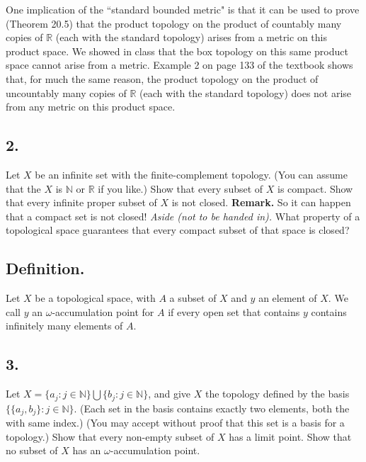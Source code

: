 \documentclass{amsart}
\theoremstyle{plain}
\theoremstyle{definition}
\theoremstyle{remark}
\begin{document}
One implication of the ``standard bounded metric" is that it can be used to prove (Theorem 20.5)  that the product topology on the product of countably many copies of $\mathbb R$ (each with the standard topology) arises from a metric on this product space. We showed in class that the box topology on this same product space cannot arise from a metric. Example 2 on page 133 of the textbook shows that, for much the same reason, the product topology on the product of uncountably many copies of $\mathbb R$ (each with the standard topology) does not arise from any metric on this product space.




\vspace{.15in}
\noindent
\subsection*{2.}  Let $X$ be an infinite set with the finite-complement topology. (You can assume that the $X$ is $\mathbb N$ or $\mathbb R$ if you like.) Show that every subset of $X$ is compact. Show that every infinite proper subset of $X$ is not closed. {\bf Remark.} So it can happen that a compact set is not closed! {\it Aside (not to be handed in).} What property of a topological space guarantees that every compact subset of that space is closed?

\vspace{.15in}
\noindent
\subsection*{Definition.} Let $X$ be a topological space, with $A$ a subset of $X$ and $y$ an element of $X$. We call $y$ an $\omega$-accumulation point for $A$ if every open set that contains $y$ contains infinitely many elements of $A$. 

\vspace{.15in}
\noindent
\subsection*{3.} Let  $X = \{ a_j : j \in \mathbb N \} \bigcup \{ b_j : j \in \mathbb N \}$, and give $X$  the topology defined by the basis $\{ \{ a_j , b_j \} : j\in \mathbb N \}$. (Each set in the basis contains exactly two elements, both the with same index.) (You may accept without proof that this set is a basis for a topology.) Show that every non-empty subset of $X$ has a limit point. Show that no subset of $X$ has an $\omega$-accumulation point.
\end{document}
